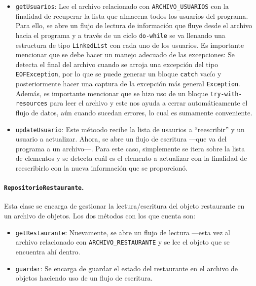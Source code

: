 \begin{itemize}
  \item \texttt{getUsuarios}: Lee el archivo relacionado con \texttt{ARCHIVO\_USUARIOS} con la finalidad
    de recuperar la lista que almacena todos los usuarios del programa. Para ello, se abre un flujo de 
    lectura de información que fluye desde el archivo hacia el programa y a través de un ciclo 
    \texttt{do-while} se va llenando una estructura de tipo \texttt{LinkedList} con cada uno de los 
    usuarios. Es importante mencionar que se debe hacer un manejo adecuado de las excepciones: Se detecta 
    el final del archivo cuando se arroja una excepción del tipo \texttt{EOFException}, por lo que se puede 
    generar un bloque \texttt{catch} vacío y posteriormente hacer una captura de la excepción más general
    \texttt{Exception}. Además, es importante mencionar que se hizo uso de un bloque 
    \texttt{try-with-resources} para leer el archivo y este nos ayuda a cerrar automáticamente el flujo de
    datos, aún cuando sucedan errores, lo cual es sumamente conveniente.
  \item \texttt{updateUsuario}: Este métoodo recibe la lista de usaurios a ``reescribir'' y un usuario a 
    actualizar. Ahora, se abre un flujo de escritura ---que va del programa a un archivo---. Para este caso, 
    simplemente se itera sobre la lista de elementos y se detecta cuál es el elemento a actualizar con la 
    finalidad de reescribirlo con la nueva información que se proporcionó.
\end{itemize}

\paragraph{\texttt{RepositorioRestaurante}.} Esta clase se encarga de gestionar la lectura/escritura del 
objeto restaurante en un archivo de objetos. Los dos métodos con los que cuenta son:

\begin{itemize}
  \item \texttt{getRestaurante}: Nuevamente, se abre un flujo de lectura ---esta vez al archivo relacionado 
    con \texttt{ARCHIVO\_RESTAURANTE} y se lee el objeto que se encuentra ahí dentro.
  \item \texttt{guardar}: Se encarga de guardar el estado del restaurante en el archivo de objetos haciendo 
    uso de un flujo de escritura.
\end{itemize}

